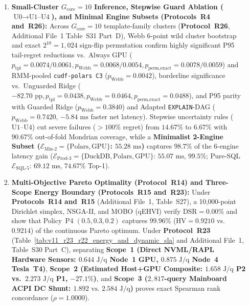 \documentclass[10pt,a4paper]{article}
\begin{document}
\begin{enumerate}[leftmargin=1.5em,itemsep=1pt]
    \item \textbf{Small-Cluster $G_{\text{core}}=10$ Inference, Stepwise Guard Ablation ($\text{U0}\rightarrow\text{U1--U4}$), and Minimal Engine Subsets (\textbf{Protocols~R4 and~R26}):} Across $G_{\text{core}}=10$ template-family clusters (\textbf{Protocol~R26}, Additional File~1 Table~S31 Part~D), Webb 6-point wild cluster bootstrap and exact $2^{10}=1{,}024$ sign-flip permutation confirm highly significant P95 tail-regret reductions vs.\ Always GPU ($p_{\text{tpl}}=0.0074/0.0061, p_{\text{Webb}}=0.0068/0.0054, p_{\text{perm,exact}}=0.0078/0.0059$) and RMM-pooled \texttt{cudf-polars C3} ($p_{\text{Webb}}=0.0042$), borderline significance vs.\ Unguarded Ridge ($-82.70\text{ pp}, p_{\text{tpl}}=0.0438, p_{\text{Webb}}=0.0464, p_{\text{perm,exact}}=0.0488$), and P95 parity with Guarded Ridge ($p_{\text{Webb}}=0.3840$) and Adapted \texttt{EXPLAIN}-DAG ($p_{\text{Webb}}=0.7420$, $-5.84\text{ ms}$ faster net latency). Stepwise uncertainty rules ($\text{U1--U4}$) cut severe failures ($>100\%$ regret) from $14.67\%$ to $6.67\%$ with $90.67\%$ out-of-fold Mondrian coverage, while a \textbf{Minimalist 2-Engine Subset ($\mathcal{E}_{\text{Min-2}}=\{\text{Polars},\text{GPU}\}$: $55.28\text{ ms}$)} captures $98.7\%$ of the 6-engine latency gain ($\mathcal{E}_{\text{Prod-3}}=\{\text{DuckDB},\text{Polars},\text{GPU}\}$: $55.07\text{ ms}$, $99.5\%$; Pure-SQL $\mathcal{E}_{\text{SQL-5}}$: $69.12\text{ ms}$, $74.67\%$ Top-1).
    \item \textbf{Multi-Objective Pareto Optimality (\textbf{Protocol~R14}) and Three-Scope Energy Boundary (\textbf{Protocols~R15 and~R23}):} Under \textbf{Protocols~R14 and~R15} (Additional File~1, Table~S27), a 10,000-point Dirichlet simplex, NSGA-II, and MOBO (qEHVI) verify $\text{DSR}=0.00\%$ and show that Policy~P4 $(0.5,0.3,0.2)$ captures $99.96\%$ ($\text{HV}=0.9210$ vs.\ $0.9214$) of the continuous Pareto optimum. Under \textbf{Protocol~R23} (Table~\ref{tab:v11_r23_r22_energy_and_dynamic_sla} and Additional File~1, Table~S30 Part~C), separating \textbf{Scope~1 (Direct NVML/RAPL Hardware Sensors: $0.644\text{ J/q}$ Node~1 GPU, $0.875\text{ J/q}$ Node~4 Tesla~T4)}, \textbf{Scope~2 (Estimated Host+GPU Composite: $1.658\text{ J/q}$ P2 vs.\ $2.273\text{ J/q}$ P1, $-27.1\%$)}, and \textbf{Scope~3 ($2{,}817$-query Mainboard ACPI DC Shunt: $1.892\text{ vs.\ }2.584\text{ J/q}$)} proves exact Spearman rank concordance ($\rho=1.0000$).

\end{enumerate}
\end{document}

